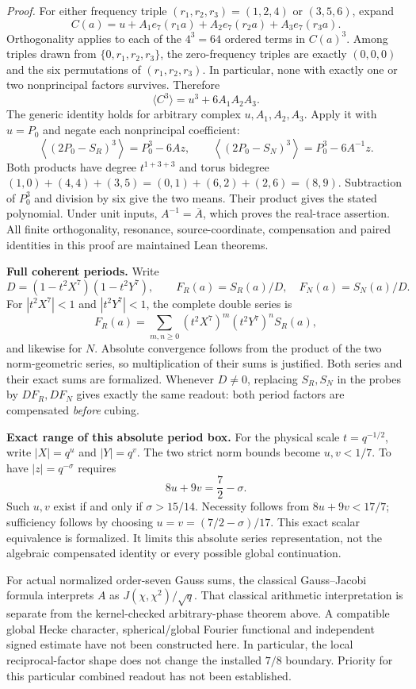 \documentclass[11pt]{article}
\begin{document}
\emph{Proof.}
For either frequency triple $(r_1,r_2,r_3)=(1,2,4)$ or $(3,5,6)$,
expand
\[
 C(a)=u+A_1e_7(r_1a)+A_2e_7(r_2a)+A_3e_7(r_3a).
\]
Orthogonality applies to each of the $4^3=64$ ordered terms in $C(a)^3$.
Among triples drawn from $\{0,r_1,r_2,r_3\}$, the zero-frequency
triples are exactly $(0,0,0)$ and the six permutations of
$(r_1,r_2,r_3)$. In particular, none with exactly one or two
nonprincipal factors survives. Therefore
\[
 \langle C^3\rangle=u^3+6A_1A_2A_3 .
\]
The generic identity holds for arbitrary complex $u,A_1,A_2,A_3$.
Apply it with $u=P_0$ and negate each nonprincipal coefficient:
\[
 \left\langle(2P_0-S_R)^3\right\rangle=P_0^3-6Az,\qquad
 \left\langle(2P_0-S_N)^3\right\rangle=P_0^3-6A^{-1}z.
\]
Both products have degree $t^{1+3+3}$ and torus bidegree
$(1,0)+(4,4)+(3,5)=(0,1)+(6,2)+(2,6)=(8,9)$.
Subtraction of $P_0^3$ and division by six give the two means.
Their product gives the stated polynomial. Under unit inputs,
$A^{-1}=\overline A$, which proves the real-trace assertion.
All finite orthogonality, resonance, source-coordinate, compensation
and paired identities in this proof are maintained Lean theorems.

\textbf{Full coherent periods.}
Write
\[
 D=(1-t^2X^7)(1-t^2Y^7),\qquad F_R(a)=S_R(a)/D,
 \quad F_N(a)=S_N(a)/D.
\]
For $|t^2X^7|<1$ and $|t^2Y^7|<1$, the complete double series is
\[
 F_R(a)=\sum_{m,n\ge0}(t^2X^7)^m(t^2Y^7)^nS_R(a),
\]
and likewise for $N$. Absolute convergence follows from the product
of the two norm-geometric series, so multiplication of their sums
is justified. Both series and their exact sums are formalized.
Whenever $D\ne0$, replacing $S_R,S_N$ in the probes by $DF_R,DF_N$
gives exactly the same readout: both period factors are compensated
\emph{before} cubing.

\textbf{Exact range of this absolute period box.}
For the physical scale $t=q^{-1/2}$, write $|X|=q^u$ and $|Y|=q^v$.
The two strict norm bounds become $u,v<1/7$. To have $|z|=q^{-\sigma}$
requires
\[
 8u+9v=\frac72-\sigma.
\]
Such $u,v$ exist if and only if $\sigma>15/14$. Necessity follows
from $8u+9v<17/7$; sufficiency follows by choosing
$u=v=(7/2-\sigma)/17$. This exact scalar equivalence is formalized.
It limits this absolute series representation, not the algebraic
compensated identity or every possible global continuation.

For actual normalized order-seven Gauss sums, the classical
Gauss--Jacobi formula interprets $A$ as
$J(\chi,\chi^2)/\sqrt q$. That classical arithmetic interpretation is
separate from the kernel-checked arbitrary-phase theorem above.
A compatible global Hecke character, spherical/global Fourier
functional and independent signed estimate have not been constructed
here. In particular, the local reciprocal-factor shape does not
change the installed $7/8$ boundary. Priority for this particular
combined readout has not been established.
\end{document}
